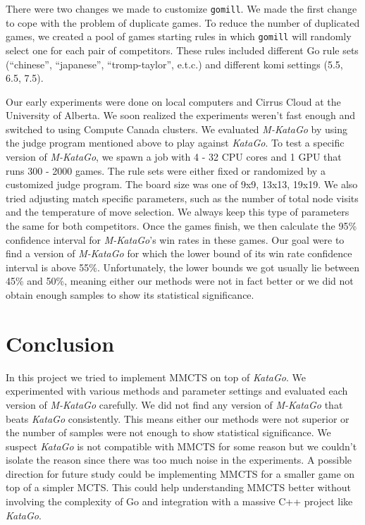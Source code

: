\documentclass{article}
\newcommand{\katago}{\emph{KataGo}\xspace}
\newcommand{\mkatago}{\emph{M-KataGo}\xspace}
\begin{document}
      There were two changes we made to customize \texttt{gomill}.
      We made the first change to cope with the problem of duplicate games.
      To reduce the number of duplicated games, we created a pool of games starting rules in which \texttt{gomill} will randomly select one for each pair of competitors.
      These rules included different Go rule sets (``chinese'', ``japanese'', ``tromp-taylor'', e.t.c.) and different komi settings (5.5, 6.5, 7.5).

      Our early experiments were done on local computers and Cirrus Cloud at the University of Alberta.
      We soon realized the experiments weren't fast enough and switched to using Compute Canada clusters.
      We evaluated \mkatago by using the judge program mentioned above to play against \katago.
      To test a specific version of \mkatago, we spawn a job with 4 - 32 CPU cores and 1 GPU that runs 300 - 2000 games.
      The rule sets were either fixed or randomized by a customized judge program.
      The board size was one of 9x9, 13x13, 19x19.
      We also tried adjusting match specific parameters, such as the number of total node visits and the temperature of move selection.
      We always keep this type of parameters the same for both competitors.
      Once the games finish, we then calculate the 95\% confidence interval for \mkatago's win rates in these games.
      Our goal were to find a version of \mkatago for which the lower bound of its win rate confidence interval is above 55\%.
      Unfortunately, the lower bounds we got usually lie between 45\% and 50\%, meaning either our methods were not in fact better or we did not obtain enough samples to show its statistical significance.


      \section{Conclusion}
      In this project we tried to implement MMCTS on top of \katago.
      We experimented with various methods and parameter settings and evaluated each version of \mkatago carefully.
      We did not find any version of \mkatago that beats \katago consistently.
      This means either our methods were not superior or the number of samples were not enough to show statistical significance.
      We suspect \katago is not compatible with MMCTS for some reason but we couldn't isolate the reason since there was too much noise in the experiments.
      A possible direction for future study could be implementing MMCTS for a smaller game on top of a simpler MCTS.
      This could help understanding MMCTS better without involving the complexity of Go and integration with a massive C++ project like \katago.
      
      
      
      
\end{document}
